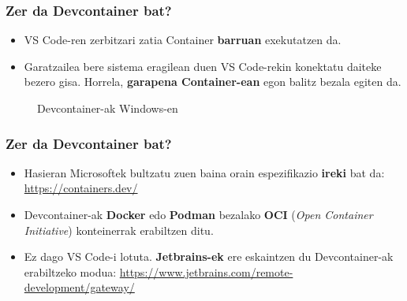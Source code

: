 \documentclass[lang=eu,biz=foe,aspectratio=169,handout]{mupresentation}
\begin{document}
\begin{frame}
  \frametitle{Zer da Devcontainer bat?}
  \begin{itemize}
    \item VS Code-ren zerbitzari zatia Container \textbf{barruan} exekutatzen da.
    \item Garatzailea bere sistema eragilean duen VS Code-rekin konektatu daiteke bezero gisa. Horrela, \textbf{garapena Container-ean} egon balitz bezala egiten da.
  \end{itemize}
  \begin{figure}
    \centering
    \caption{Devcontainer-ak Windows-en}
  \end{figure}
\end{frame}

\begin{frame}
  \frametitle{Zer da Devcontainer bat?}
  \begin{itemize}
    \item Hasieran Microsoftek bultzatu zuen baina orain espezifikazio \textbf{ireki} bat da:
      \url{https://containers.dev/}
    \item Devcontainer-ak \textbf{Docker} edo \textbf{Podman} bezalako \textbf{OCI} (\textit{Open Container Initiative}) konteinerrak erabiltzen ditu.
    \item Ez dago VS Code-i lotuta. \textbf{Jetbrains-ek} ere eskaintzen du Devcontainer-ak erabiltzeko modua: \url{https://www.jetbrains.com/remote-development/gateway/}
  \end{itemize}
\end{frame}
\end{document}
